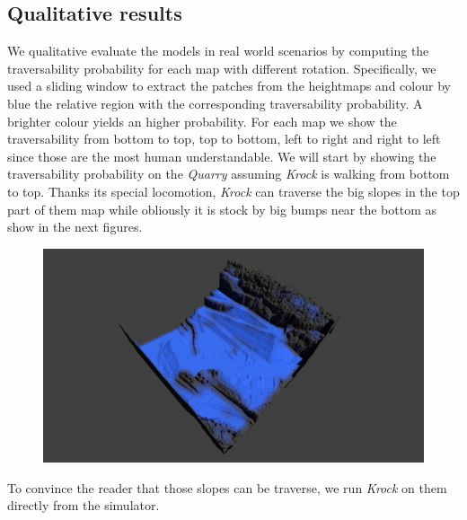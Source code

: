 \documentclass[../document.tex]{subfiles}
\begin{document}
\subsection{Qualitative results}
We qualitative evaluate the models in real world scenarios by computing the traversability probability for each map with different rotation. Specifically, we used a sliding window to extract the patches from the heightmaps and colour by blue the relative region with the corresponding traversability probability. A brighter colour yields an higher probability. For each map we show the traversability from bottom to top, top to bottom, left to right and right to left since those are the most human understandable.
We will start by showing the traversability probability on the \emph{Quarry} assuming \emph{Krock} is walking from bottom to top.
Thanks its special locomotion, \emph{Krock} can traverse the big slopes in the top part of them map while obliously it is stock by big bumps near the bottom as show in the next figures.
\begin{figure}[H]
\centering
\includegraphics[width=\linewidth]{../img/4/traversability/quarry/querry-big-10-270.png}
\end{figure}
To convince the reader that those slopes can be traverse, we run \emph{Krock} on them directly from the simulator.
\end{document}
